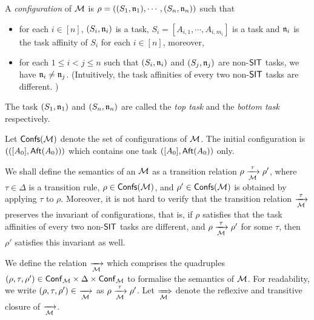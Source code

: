 A \emph{configuration} of ${\mathcal{M} }$ is $\rho = ((S_1,\mathfrak{n}_1), \cdots, (S_n,\mathfrak{n}_n))$ such that
\begin{itemize}
\item for each $i \in [n]$, $(S_i,\mathfrak{n}_i)$ is a task, $S_i = [A_{i,1}, \cdots, A_{i, m_i}]$ is a task and $\mathfrak{n}_i$ is the task affinity of $S_i$ for each $i \in [n]$, moreover, 
%
\item for each $1 \le i < j \le n$ such that $(S_i, \mathfrak{n}_i)$ and $(S_j, \mathfrak{n}_j)$ are non-$\mathsf{SIT}$ tasks,  we have $ \mathfrak{n}_i \neq \mathfrak{n}_j$.  (Intuitively, the task affinities of every two non-$\mathsf{SIT}$ tasks are different. )
\end{itemize}
The task $(S_1,\mathfrak{n}_1)$ and $(S_n,\mathfrak{n}_n)$ are called the \emph{top task} and the \emph{bottom task} respectively. 


Let ${\mathsf{Confs} }({\mathcal{M} })$ denote the set of configurations of ${\mathcal{M} }$.
The initial configuration is $(([A_0],{\sf Aft}(A_0)))$ which contains one task $([A_0], {\sf Aft}(A_0))$ only. 

We shall define the semantics of an {\AMASS} ${\mathcal{M} }$ as a transition relation $\rho \xrightarrow[{\mathcal{M} }]{\tau} \rho'$, where $\tau \in \Delta$ is a transition rule, $\rho \in {\mathsf{Confs} }({\mathcal{M} })$, and $\rho' \in {\mathsf{Confs} }({\mathcal{M} })$ is obtained by applying $\tau$ to $\rho$. Moreover, it is not hard to verify that the transition relation $\xrightarrow[{\mathcal{M} }]{\tau}$ preserves the invariant of configurations, that is, if $\rho$ satisfies that the task affinities of every two non-${\sf SIT}$ tasks are different, and $\rho \xrightarrow[{\mathcal{M} }]{\tau} \rho'$ for some $\tau$, then $\rho'$ satisfies this invariant as well. 

We define the relation $\xrightarrow[{\mathcal{M} }]{}$ which comprises the quadruples $(\rho, \tau, \rho') \in {\mathsf{Conf} }_{\mathcal{M} } \times \Delta  \times {\mathsf{Conf} }_{\mathcal{M} }$ to formalise the semantics of ${\mathcal{M} }$. For readability, we write $(\rho, \tau, \rho')\in\ \xrightarrow[{\mathcal{M} }]{}$  as $\rho \xrightarrow[{\mathcal{M} }]{\tau} \rho'$. 
Let $\xRightarrow[{\mathcal{M} }]{}$ denote the reflexive and transitive closure of $\xrightarrow[{\mathcal{M} }]{}$.

